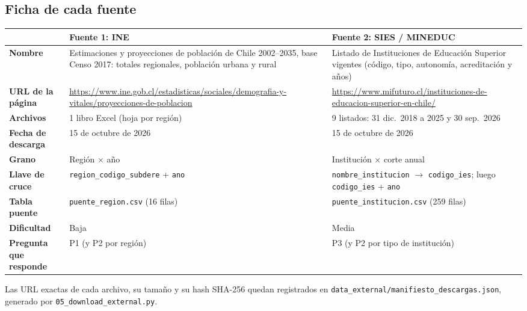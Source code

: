 \documentclass[11pt,a4paper]{article}
\begin{document}
\subsection{Ficha de cada fuente}
\begin{center}
\small
\begin{tabularx}{\textwidth}{@{}>{\bfseries}p{3cm}YY@{}}
\toprule
 & \textbf{Fuente 1: INE} & \textbf{Fuente 2: SIES / MINEDUC} \\
\midrule
Nombre & Estimaciones y proyecciones de poblaci\'on de Chile 2002--2035, base Censo 2017: totales regionales, poblaci\'on urbana y rural & Listado de Instituciones de Educaci\'on Superior vigentes (c\'odigo, tipo, autonom\'ia, acreditaci\'on y a\~nos) \\
URL de la p\'agina & \url{https://www.ine.gob.cl/estadisticas/sociales/demografia-y-vitales/proyecciones-de-poblacion} & \url{https://www.mifuturo.cl/instituciones-de-educacion-superior-en-chile/} \\
Archivos & 1 libro Excel (hoja por regi\'on) & 9 listados: 31 dic.\ 2018 a 2025 y 30 sep.\ 2026 \\
Fecha de descarga & 15 de octubre de 2026 & 15 de octubre de 2026 \\
Grano & Regi\'on $\times$ a\~no & Instituci\'on $\times$ corte anual \\
Llave de cruce & \texttt{region\_codigo\_subdere} + \texttt{ano} & \texttt{nombre\_institucion} $\rightarrow$ \texttt{codigo\_ies}; luego \texttt{codigo\_ies} + \texttt{ano} \\
Tabla puente & \texttt{puente\_region.csv} (16 filas) & \texttt{puente\_institucion.csv} (259 filas) \\
Dificultad & Baja & Media \\
Pregunta que responde & P1 (y P2 por regi\'on) & P3 (y P2 por tipo de instituci\'on) \\
\bottomrule
\end{tabularx}
\end{center}

Las URL exactas de cada archivo, su tama\~no y su hash SHA-256 quedan registrados en \texttt{data\_external/manifiesto\_descargas.json}, generado por \texttt{05\_download\_external.py}.
\end{document}
